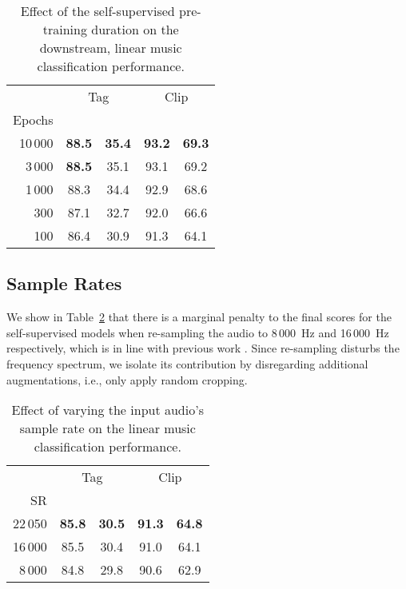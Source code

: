 \documentclass{article}
\begin{document}
\begin{table}[t]
\centering
    \footnotesize
    \begin{tabular}{rcccc}
    \toprule
    &\multicolumn{2}{c}{Tag} &\multicolumn{2}{c}{Clip}\\
    \cmidrule(lr){2-3} \cmidrule(lr){4-5}
    Epochs &  &  &  &   \\
    \midrule
    10\,000 & \textbf{88.5} & \textbf{35.4} & \textbf{93.2} & \textbf{69.3} \\
    3\,000 & \textbf{88.5} & 35.1 & 93.1 & 69.2 \\
    1\,000 & 88.3 & 34.4 & 92.9 & 68.6 \\
    300 & 87.1 & 32.7 & 92.0 & 66.6 \\
    100 & 86.4 & 30.9 & 91.3 & 64.1 \\
    \bottomrule
    \end{tabular}
    \caption{Effect of the self-supervised pre-training duration on the downstream, linear music classification performance.}
    \label{tab:epoch_ablation}
\end{table}



\subsection{Sample Rates}
\label{subsection:sample_rates}
We show in Table~\ref{tab:sample_rate_ablation} that there is a marginal penalty to the final scores for the self-supervised models when re-sampling the audio to 8\,000~Hz and 16\,000~Hz respectively, which is in line with previous work \cite{lee2018samplecnn}.
Since re-sampling disturbs the frequency spectrum, we isolate its contribution by disregarding additional augmentations, i.e., only apply random cropping.

\begin{table}[t]
\centering
    \footnotesize
      \begin{tabular}{rcccc}
        \toprule
        &\multicolumn{2}{c}{Tag} &\multicolumn{2}{c}{Clip}\\
        \cmidrule(lr){2-3} \cmidrule(lr){4-5}
        SR &  &  &  &   \\
        \midrule
        22\,050 & \textbf{85.8} & \textbf{30.5} & \textbf{91.3} & \textbf{64.8} \\
        16\,000 & 85.5 & 30.4 & 91.0 & 64.1 \\
        8\,000 & 84.8 & 29.8 & 90.6 & 62.9 \\
        \bottomrule
      \end{tabular}
      \caption{Effect of varying the input audio's sample rate on the linear music classification performance.}
      \label{tab:sample_rate_ablation}
    \end{table}
\end{document}
